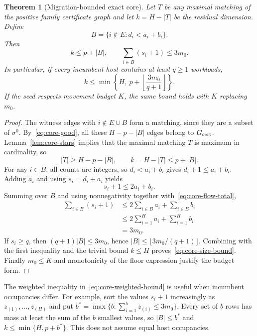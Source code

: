 \documentclass[11pt]{article}
\newtheorem{theorem}{Theorem}
\begin{document}
\begin{theorem}[Migration-bounded exact core]\label{thm:migration-core}
Let $T$ be any maximal matching of the positive family certificate graph and let $k=H-|T|$ be the residual dimension. Define
\begin{equation}
B=\{i\notin E:d_i<a_i+b_i\}.
\end{equation}
Then
\begin{equation}\label{eq:core-weighted-bound}
k\le p+|B|,\qquad \sum_{i\in B}(s_i+1)\le3m_0.
\end{equation}
In particular, if every incumbent host contains at least $q\ge1$ workloads,
\begin{equation}\label{eq:core-size-bound}
k\le\min\left\{H,\ p+\left\lfloor\frac{3m_0}{q+1}\right\rfloor\right\}.
\end{equation}
If the seed respects movement budget $K$, the same bound holds with $K$ replacing $m_0$.
\end{theorem}
\begin{proof}
The witness edges with $i\notin E\cup B$ form a matching, since they are a subset of $\sigma^0$. By~\eqref{eq:core-good}, all these $H-p-|B|$ edges belong to $G_{\rm cert}$. Lemma~\ref{lem:core-stars} implies that the maximal matching $T$ is maximum in cardinality, so
\begin{equation}
|T|\ge H-p-|B|,\qquad k=H-|T|\le p+|B|.
\end{equation}
For any $i\in B$, all counts are integers, so $d_i<a_i+b_i$ gives $d_i+1\le a_i+b_i$. Adding $a_i$ and using $s_i=d_i+a_i$ yields
\begin{equation}
s_i+1\le2a_i+b_i.
\end{equation}
Summing over $B$ and using nonnegativity together with~\eqref{eq:core-flow-total},
\begin{align}
\sum_{i\in B}(s_i+1)
&\le 2\sum_{i\in B}a_i+\sum_{i\in B}b_i\nonumber\\
&\le 2\sum_{i=1}^H a_i+\sum_{i=1}^H b_i\nonumber\\
&=3m_0.
\end{align}
If $s_i\ge q$, then $(q+1)|B|\le3m_0$, hence $|B|\le\lfloor3m_0/(q+1)\rfloor$. Combining with the first inequality and the trivial bound $k\le H$ proves~\eqref{eq:core-size-bound}. Finally $m_0\le K$ and monotonicity of the floor expression justify the budget form.
\end{proof}

The weighted inequality in~\eqref{eq:core-weighted-bound} is useful when incumbent occupancies differ. For example, sort the values $s_i+1$ increasingly as $z_{(1)},\ldots,z_{(H)}$ and put $b^*=\max\{b:\sum_{i=1}^b z_{(i)}\le3m_0\}$. Every set of $b$ rows has mass at least the sum of the $b$ smallest values, so $|B|\le b^*$ and $k\le\min\{H,p+b^*\}$. This does not assume equal host occupancies.
\end{document}
